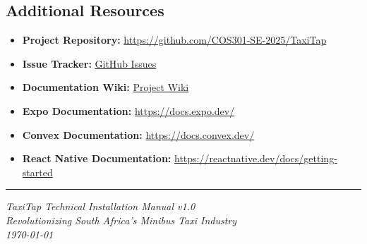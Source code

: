 \documentclass[a4paper,12pt]{article}
\begin{document}
\subsection{Additional Resources}

\begin{itemize}
    \item \textbf{Project Repository:} \href{https://github.com/COS301-SE-2025/TaxiTap}{https://github.com/COS301-SE-2025/TaxiTap}
    \item \textbf{Issue Tracker:} \href{https://github.com/COS301-SE-2025/TaxiTap/issues}{GitHub Issues}
    \item \textbf{Documentation Wiki:} \href{https://github.com/COS301-SE-2025/TaxiTap/wiki}{Project Wiki}
    \item \textbf{Expo Documentation:} \href{https://docs.expo.dev/}{https://docs.expo.dev/}
    \item \textbf{Convex Documentation:} \href{https://docs.convex.dev/}{https://docs.convex.dev/}
    \item \textbf{React Native Documentation:} \href{https://reactnative.dev/docs/getting-started}{https://reactnative.dev/docs/getting-started}
\end{itemize}

\vfill
\hrule
\vspace{0.5cm}
\begin{center}
\textit{TaxiTap Technical Installation Manual v1.0}\\
\textit{Revolutionizing South Africa's Minibus Taxi Industry}\\
\textit{\today}
\end{center}
\end{document}
